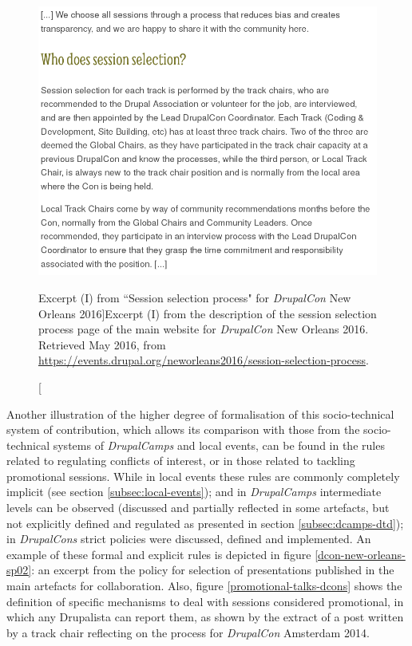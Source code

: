 \begin{figure}[H]
\centering
\includegraphics[scale=0.45]{img/quotes_replacement/session_selection_new_orleans_june_2016.png}
\caption[Excerpt (I) from ``Session selection process" for \textit{DrupalCon} New Orleans 2016]{Excerpt (I) from the description of the session selection process page of the main website for \textit{DrupalCon} New Orleans 2016. Retrieved  May 2016, from \url{https://events.drupal.org/neworleans2016/session-selection-process}.}
\label{dcon-new-orleans-sp01}
\end{figure}

Another illustration of the higher degree of formalisation of this socio-technical system of contribution, which allows its comparison with those from the socio-technical systems of \textit{DrupalCamps} and local events, can be found in the rules related to regulating conflicts of interest, or in those related to tackling promotional sessions. While in local events these rules are commonly completely implicit (see section \ref{subsec:local-events}); and in \textit{DrupalCamps} intermediate levels can be observed (discussed and partially reflected in some artefacts, but not explicitly defined and regulated as presented in section \ref{subsec:dcamps-dtd}); in \textit{DrupalCons} strict policies were discussed, defined and implemented. An example of these formal and explicit rules is depicted in figure \ref{dcon-new-orleans-sp02}: an excerpt from the policy for selection of presentations published in the main artefacts for collaboration. Also, figure \ref{promotional-talks-dcons} shows the definition of specific mechanisms to deal with sessions considered promotional, in which any Drupalista can report them, as shown by the extract of a post written by a track chair reflecting on the process for \textit{DrupalCon} Amsterdam 2014.

